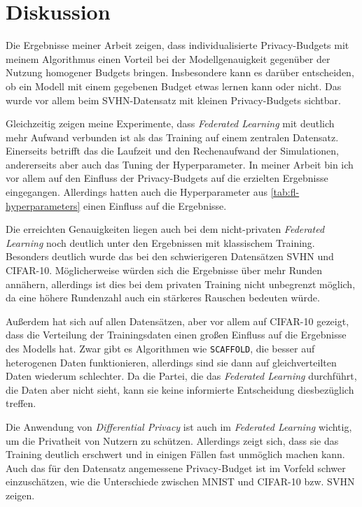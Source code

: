\chapter{Diskussion}


Die Ergebnisse meiner Arbeit zeigen, dass individualisierte Privacy-Budgets mit meinem Algorithmus einen Vorteil bei der Modellgenauigkeit gegenüber der Nutzung homogener Budgets bringen. Insbesondere kann es darüber entscheiden, ob ein Modell mit einem gegebenen Budget etwas lernen kann oder nicht. Das wurde vor allem beim SVHN-Datensatz mit kleinen Privacy-Budgets sichtbar.

Gleichzeitig zeigen meine Experimente, dass \textit{Federated Learning} mit deutlich mehr Aufwand verbunden ist als das Training auf einem zentralen Datensatz. Einerseits betrifft das die Laufzeit und den Rechenaufwand der Simulationen, andererseits aber auch das Tuning der Hyperparameter. In meiner Arbeit bin ich vor allem auf den Einfluss der Privacy-Budgets auf die erzielten Ergebnisse eingegangen. Allerdings hatten auch die Hyperparameter aus \autoref{tab:fl-hyperparameters} einen Einfluss auf die Ergebnisse.

Die erreichten Genauigkeiten liegen auch bei dem nicht-privaten \textit{Federated Learning} noch deutlich unter den Ergebnissen mit klassischem Training. Besonders deutlich wurde das bei den schwierigeren Datensätzen SVHN und CIFAR-10. Möglicherweise würden sich die Ergebnisse über mehr Runden annähern, allerdings ist dies bei dem privaten Training nicht unbegrenzt möglich, da eine höhere Rundenzahl auch ein stärkeres Rauschen bedeuten würde.

Außerdem hat sich auf allen Datensätzen, aber vor allem auf CIFAR-10 gezeigt, dass die Verteilung der Trainingsdaten einen großen Einfluss auf die Ergebnisse des Modells hat. Zwar gibt es Algorithmen wie \texttt{SCAFFOLD}, die besser auf heterogenen Daten funktionieren, allerdings sind sie dann auf gleichverteilten Daten wiederum schlechter. Da die Partei, die das \textit{Federated Learning} durchführt, die Daten aber nicht sieht, kann sie keine informierte Entscheidung diesbezüglich treffen.

Die Anwendung von \textit{Differential Privacy} ist auch im \textit{Federated Learning} wichtig, um die Privatheit von Nutzern zu schützen. Allerdings zeigt sich, dass sie das Training deutlich erschwert und in einigen Fällen fast unmöglich machen kann. Auch das für den Datensatz angemessene Privacy-Budget ist im Vorfeld schwer einzuschätzen, wie die Unterschiede zwischen MNIST und CIFAR-10 bzw. SVHN zeigen.

